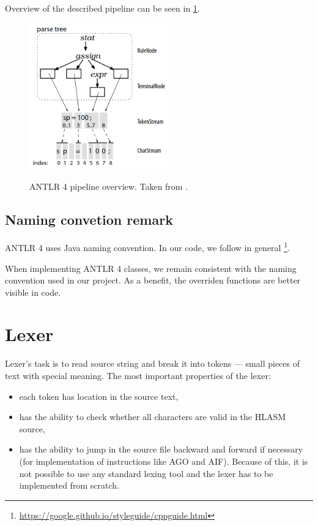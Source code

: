 Overview of the described pipeline can be seen in \cref{antlr_pipeline}.

\begin{figure}[H]
	\centering
	\includegraphics[width=6cm]{img/antlr_pipeline}
	\label{antlr_pipeline}
	\caption{ANTLR 4 pipeline overview. Taken from \cite{parr2013definitive}.}
\end{figure}

\subsection{Naming convetion remark}
ANTLR 4 uses Java naming convention. In our code, we follow in general \footnote{\url{https://google.github.io/styleguide/cppguide.html}}. 

When implementing ANTLR 4 classes, we remain consistent with the naming convention used in our project. As a benefit, the overriden functions are better visible in code.

\section{Lexer}

Lexer's task is to read source string and break it into tokens --- small pieces of text with special meaning. The most important properties of the lexer:
\begin{itemize}
	\item each token has location in the source text,
	\item has the ability to check whether all characters are valid in the HLASM source,
	\item has the ability to jump in the source file backward and forward if necessary (for implementation of instructions like AGO and AIF). Because of this, it is not possible to use any standard lexing tool and the lexer has to be implemented from scratch.
\end{itemize}

